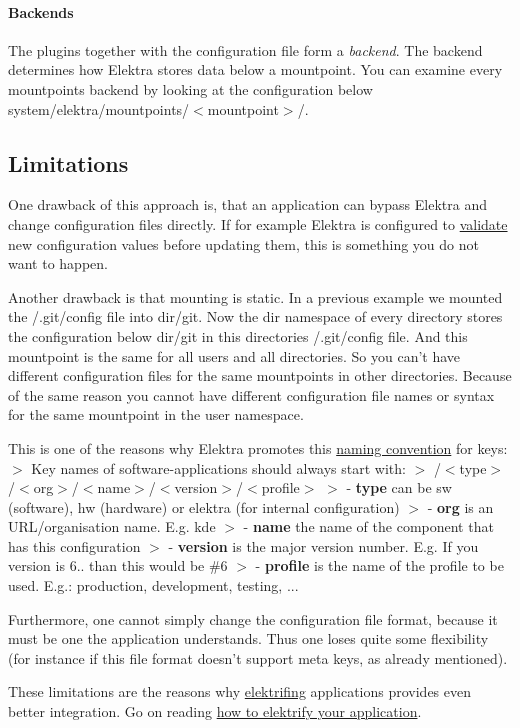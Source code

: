 \paragraph*{Backends}

The plugins together with the configuration file form a {\itshape backend}. The backend determines how Elektra stores data below a mountpoint. You can examine every mountpoints backend by looking at the configuration below {\ttfamily system/elektra/mountpoints/$<$mountpoint$>$/}.

\subsection*{Limitations}

One drawback of this approach is, that an application can bypass Elektra and change configuration files directly. If for example Elektra is configured to \hyperlink{doc_tutorials_validation_md}{validate} new configuration values before updating them, this is something you do not want to happen.

Another drawback is that mounting is static. In a previous example we mounted the {\ttfamily /.git/config} file into {\ttfamily dir/git}. Now the {\ttfamily dir} namespace of every directory stores the configuration below {\ttfamily dir/git} in this directories {\ttfamily /.git/config} file. And this mountpoint is the same for all users and all directories. So you can't have different configuration files for the same mountpoints in other directories. Because of the same reason you cannot have different configuration file names or syntax for the same mountpoint in the {\ttfamily user} namespace.

This is one of the reasons why Elektra promotes this \hyperlink{md_doc_help_elektra-key-names_doc_help_elektra-key-names_md}{naming convention} for keys\+: $>$ Key names of software-\/applications should always start with\+: $>$ {\ttfamily /$<$type$>$/$<$org$>$/$<$name$>$/$<$version$>$/$<$profile$>$} $>$ -\/ {\bfseries type} can be {\ttfamily sw} (software), {\ttfamily hw} (hardware) or {\ttfamily elektra} (for internal configuration) $>$ -\/ {\bfseries org} is an U\+R\+L/organisation name. E.\+g. {\ttfamily kde} $>$ -\/ {\bfseries name} the name of the component that has this configuration $>$ -\/ {\bfseries version} is the major version number. E.\+g. If you version is 6.. than this would be {\ttfamily \#6} $>$ -\/ {\bfseries profile} is the name of the profile to be used. E.\+g.\+: {\ttfamily production}, {\ttfamily development}, {\ttfamily testing}, ...

Furthermore, one cannot simply change the configuration file format, because it must be one the application understands. Thus one loses quite some flexibility (for instance if this file format doesn't support meta keys, as already mentioned).

These limitations are the reasons why \hyperlink{md_doc_help_elektra-glossary_doc_help_elektra-glossary_md}{elektrifing} applications provides even better integration. Go on reading \hyperlink{doc_tutorials_application-integration_md}{how to elektrify your application}. 